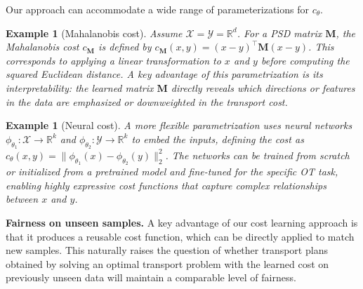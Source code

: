 \documentclass{article}
\newtheorem{ex}[thm]{Example}
\theoremstyle{definition}
\begin{document}
Our approach can accommodate a wide range of parameterizations for $c_{\theta}$.
\begin{ex}[Mahalanobis cost]
\label{ex:maha}
     Assume $\mathcal{X}=\mathcal{Y}=\mathbb{R}^d$. For a PSD matrix $\mathbf{M}$, the Mahalanobis cost $c_{\mathbf{M}}$ is defined by $c_{\mathbf{M}}(x,y) = (x - y)^\top\mathbf{M}(x - y)$. This corresponds to applying a linear transformation to $x$ and $y$ before computing the squared Euclidean distance. A key advantage of this parametrization is its interpretability: the learned matrix $\mathbf{M}$ directly reveals which directions or features in the data are emphasized or downweighted in the transport cost.
\end{ex}
\begin{ex}[Neural cost]
\label{ex:neural}
A more flexible parametrization uses neural networks $\phi_{\theta_1}:\mathcal{X} \to \mathbb{R}^k$ and $\phi_{\theta_2}:\mathcal{Y} \to \mathbb{R}^k$ to embed the inputs, defining the cost as $c_{\theta}(x,y) = \lVert\phi_{\theta_1}(x) - \phi_{\theta_2}(y)\rVert^2_2$.
The networks can be trained from scratch or initialized from a pretrained model and fine-tuned for the specific OT task, enabling highly expressive cost functions that capture complex relationships between $x$ and $y$.
\end{ex}
\textbf{Fairness on unseen samples.} A key advantage of our cost learning approach is that it produces a reusable cost function, which can be directly applied to match new samples. This naturally raises the question of whether transport plans obtained by solving an optimal transport problem with the learned cost on previously unseen data will maintain a comparable level of fairness.
\end{document}
